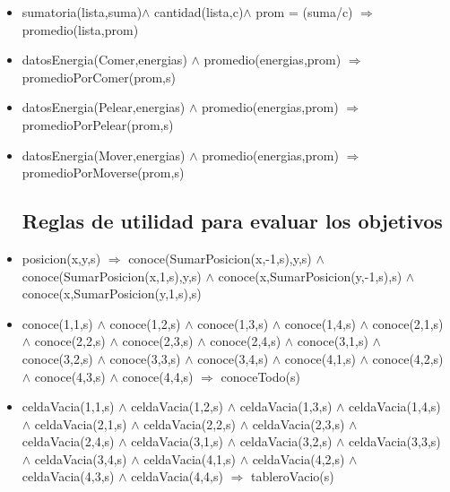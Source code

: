 \begin{itemize}
\item sumatoria(lista,suma)$\land$ cantidad(lista,c)$\land$ prom = (suma/c)
\newline
       $\Rightarrow$ promedio(lista,prom)

\item  datosEnergia(Comer,energias) $\land$ 
 promedio(energias,prom) $\Rightarrow$
 promedioPorComer(prom,s)
       
\item  datosEnergia(Pelear,energias) $\land$ 
 promedio(energias,prom) $\Rightarrow$
 promedioPorPelear(prom,s)

\item  datosEnergia(Mover,energias) $\land$ 
 promedio(energias,prom) $\Rightarrow$
 promedioPorMoverse(prom,s)

\subsection{Reglas de utilidad para evaluar los objetivos}
\item posicion(x,y,s) $\Rightarrow$
 conoce(SumarPosicion(x,-1,s),y,s) $\land$  
 conoce(SumarPosicion(x,1,s),y,s) $\land$ 
 conoce(x,SumarPosicion(y,-1,s),s) $\land$ 
 conoce(x,SumarPosicion(y,1,s),s) 

\item conoce(1,1,s) $\land$ conoce(1,2,s) $\land$ 
 conoce(1,3,s) $\land$ conoce(1,4,s) $\land$ 
 \newline 
 conoce(2,1,s) $\land$ conoce(2,2,s) $\land$ 
 conoce(2,3,s) $\land$ conoce(2,4,s) $\land$ 
 \newline 
 conoce(3,1,s) $\land$ conoce(3,2,s) $\land$ 
 conoce(3,3,s) $\land$ conoce(3,4,s) $\land$ 
 \newline 
 conoce(4,1,s) $\land$ conoce(4,2,s) $\land$ 
 conoce(4,3,s) $\land$ conoce(4,4,s) 
 \newline
 $\Rightarrow$ conoceTodo(s)

\item celdaVacia(1,1,s) $\land$ celdaVacia(1,2,s) $\land$ 
 celdaVacia(1,3,s) $\land$ celdaVacia(1,4,s) $\land$ 
 \newline 
 celdaVacia(2,1,s) $\land$ celdaVacia(2,2,s) $\land$ 
 celdaVacia(2,3,s) $\land$ celdaVacia(2,4,s) $\land$
 \newline  
 celdaVacia(3,1,s) $\land$ celdaVacia(3,2,s) $\land$ 
 celdaVacia(3,3,s) $\land$ celdaVacia(3,4,s) $\land$ 
 \newline 
 celdaVacia(4,1,s) $\land$ celdaVacia(4,2,s) $\land$ 
 celdaVacia(4,3,s) $\land$ celdaVacia(4,4,s) 
 $\Rightarrow$ tableroVacio(s)
 

\end{itemize}

